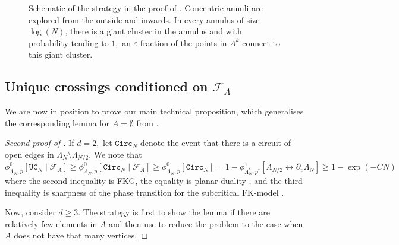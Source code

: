 \documentclass[article,11pt,reqno]{amsart}
\newcommand{\cc}{\leftrightarrow}
\begin{document}
\begin{appendix}
\begin{figure}
\caption{Schematic of the strategy in the proof of . Concentric annuli are explored from the outside and inwards. In every annulus of size $\log(N)$, there is a giant cluster in the annulus and with probability tending to $1,$ an $\varepsilon$-fraction of the points in $A^k$ connect to this giant cluster. }
    \label{fig:catching_figure}
\end{figure}


\subsection{Unique crossings conditioned on \texorpdfstring{$\mathcal{F}_A$}{F\_A}}
We are now in position to prove our main technical proposition, which generalises the corresponding lemma for $A=\emptyset$ from \cite[Lemma 4.8]{hansen2023uniform}.
\begin{proof}[Second proof of ]
If $d=2,$ let $\mathtt{Circ}_N$ denote the event that there is a circuit of open edges in $\Lambda_N\setminus \Lambda_{N/2}.$ We note that
$$
\phi^0_{\Lambda_N,p}[\mathtt{UC}_N\mid \mathcal{F}_A]\geq \phi^0_{\Lambda_N,p}[\mathtt{Circ}_N\mid \mathcal{F}_A]\geq \phi^0_{\Lambda_N,p}[\mathtt{Circ}_N]=1-\phi^1_{\Lambda_N^*,p^*}[ \Lambda_{N/2}\cc \partial_v\Lambda_{N}]\geq 1-\exp(-CN)
$$
where the second inequality is FKG, the equality is planar duality \cite[Proposition 2.17]{DC17}, and the third inequality is sharpness of the phase transition for the subcritical FK-model \cite{DCsharpness}.

Now, consider $d\geq 3.$ 
The strategy is first to show the lemma if there are relatively few elements in $A$ and then use  to reduce the problem to the case when $A$ does not have that many vertices.


\end{proof}
\end{appendix}
\end{document}
